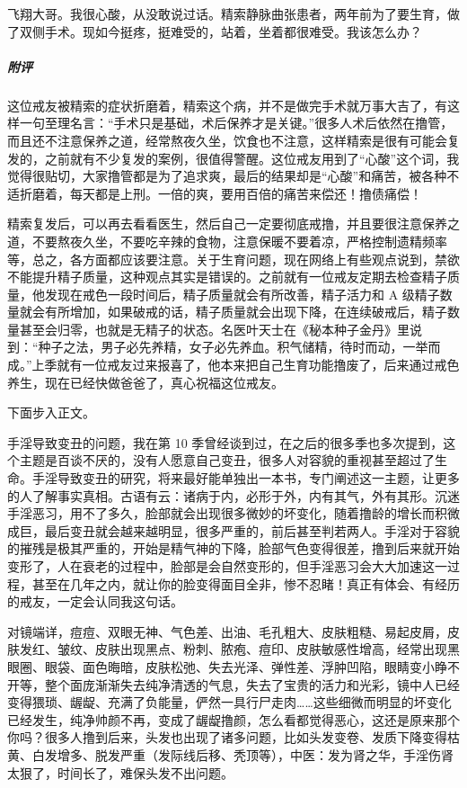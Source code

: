 \begin{case}
    飞翔大哥。我很心酸，从没敢说过话。精索静脉曲张患者，两年前为了要生育，做了双侧手术。现如今挺疼，挺难受的，站着，坐着都很难受。我该怎么办？
    \subparagraph{附评} 这位戒友被精索的症状折磨着，精索这个病，并不是做完手术就万事大吉了，有这样一句至理名言：“手术只是基础，术后保养才是关键。”很多人术后依然在撸管，而且还不注意保养之道，经常熬夜久坐，饮食也不注意，这样精索是很有可能会复发的，之前就有不少复发的案例，很值得警醒。这位戒友用到了“心酸”这个词，我觉得很贴切，大家撸管都是为了追求爽，最后的结果却是“心酸”和痛苦，被各种不适折磨着，每天都是上刑。一倍的爽，要用百倍的痛苦来偿还！撸债痛偿！

    精索复发后，可以再去看看医生，然后自己一定要彻底戒撸，并且要很注意保养之道，不要熬夜久坐，不要吃辛辣的食物，注意保暖不要着凉，严格控制遗精频率等，总之，各方面都应该要注意。关于生育问题，现在网络上有些观点说到，禁欲不能提升精子质量，这种观点其实是错误的。之前就有一位戒友定期去检查精子质量，他发现在戒色一段时间后，精子质量就会有所改善，精子活力和 A 级精子数量就会有所增加，如果破戒的话，精子质量就会出现下降，在连续破戒后，精子数量甚至会归零，也就是无精子的状态。名医叶天士在《秘本种子金丹》里说到：“种子之法，男子必先养精，女子必先养血。积气储精，待时而动，一举而成。”上季就有一位戒友过来报喜了，他本来把自己生育功能撸废了，后来通过戒色养生，现在已经快做爸爸了，真心祝福这位戒友。
\end{case}

下面步入正文。

手淫导致变丑的问题，我在第 10 季曾经谈到过，在之后的很多季也多次提到，这个主题是百谈不厌的，没有人愿意自己变丑，很多人对容貌的重视甚至超过了生命。手淫导致变丑的研究，将来最好能单独出一本书，专门阐述这一主题，让更多的人了解事实真相。古语有云：诸病于内，必形于外，内有其气，外有其形。沉迷手淫恶习，用不了多久，脸部就会出现很多微妙的坏变化，随着撸龄的增长而积微成巨，最后变丑就会越来越明显，很多严重的，前后甚至判若两人。手淫对于容貌的摧残是极其严重的，开始是精气神的下降，脸部气色变得很差，撸到后来就开始变形了，人在衰老的过程中，脸部是会自然变形的，但手淫恶习会大大加速这一过程，甚至在几年之内，就让你的脸变得面目全非，惨不忍睹！真正有体会、有经历的戒友，一定会认同我这句话。

对镜端详，痘痘、双眼无神、气色差、出油、毛孔粗大、皮肤粗糙、易起皮屑，皮肤发红、皱纹、皮肤出现黑点、粉刺、脓疱、痘印、皮肤敏感性增高，经常出现黑眼圈、眼袋、面色晦暗，皮肤松弛、失去光泽、弹性差、浮肿凹陷，眼睛变小睁不开等，整个面庞渐渐失去纯净清透的气息，失去了宝贵的活力和光彩，镜中人已经变得猥琐、龌龊、充满了负能量，俨然一具行尸走肉……这些细微而明显的坏变化已经发生，纯净帅颜不再，变成了龌龊撸颜，怎么看都觉得恶心，这还是原来那个你吗？很多人撸到后来，头发也出现了诸多问题，比如头发变卷、发质下降变得枯黄、白发增多、脱发严重（发际线后移、秃顶等），中医：发为肾之华，手淫伤肾太狠了，时间长了，难保头发不出问题。

